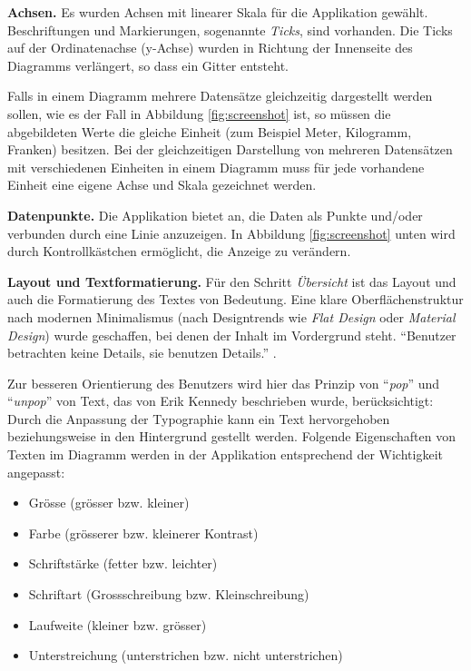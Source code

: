 \textbf{Achsen.} Es wurden Achsen mit linearer Skala für die Applikation gewählt. Beschriftungen und Markierungen, sogenannte \textit{Ticks}, sind vorhanden. Die Ticks auf der Ordinatenachse (y-Achse) wurden in Richtung der Innenseite des Diagramms verlängert, so dass ein Gitter entsteht.

Falls in einem Diagramm mehrere Datensätze gleichzeitig dargestellt werden sollen, wie es der Fall in Abbildung \ref{fig:screenshot} ist, so müssen die abgebildeten Werte die gleiche Einheit (zum Beispiel Meter, Kilogramm, Franken) besitzen. Bei der gleichzeitigen Darstellung von mehreren Datensätzen mit verschiedenen Einheiten in einem Diagramm muss für jede vorhandene Einheit eine eigene Achse und Skala gezeichnet werden.

\textbf{Datenpunkte.} Die Applikation bietet an, die Daten als Punkte und/oder verbunden durch eine Linie anzuzeigen. In Abbildung \ref{fig:screenshot} unten wird durch Kontrollkästchen ermöglicht, die Anzeige zu verändern.

\textbf{Layout und Textformatierung.} Für den Schritt \textit{Übersicht} ist das Layout und auch die Formatierung des Textes von Bedeutung. Eine klare Oberflächenstruktur nach modernen Minimalismus (nach Designtrends wie \textit{Flat Design} oder \textit{Material Design}) wurde geschaffen, bei denen der Inhalt im Vordergrund steht. "`Benutzer betrachten keine Details, sie benutzen Details."' \cite{minimalism}.

Zur besseren Orientierung des Benutzers wird hier das Prinzip von "`\textit{pop}"' und "`\textit{unpop}"' von Text, das von Erik Kennedy \cite{pop} beschrieben wurde, berücksichtigt: Durch die Anpassung der Typographie kann ein Text hervorgehoben beziehungsweise in den Hintergrund gestellt werden. Folgende Eigenschaften von Texten im Diagramm werden in der Applikation entsprechend der Wichtigkeit angepasst:

\begin{itemize}
	\item Grösse (grösser bzw. kleiner)
	\item Farbe (grösserer bzw. kleinerer Kontrast)
	\item Schriftstärke (fetter bzw. leichter)
	\item Schriftart (Grossschreibung bzw. Kleinschreibung)
	\item Laufweite (kleiner bzw. grösser)
	\item Unterstreichung (unterstrichen bzw. nicht unterstrichen)
\end{itemize}

